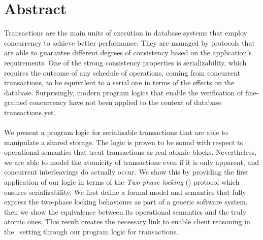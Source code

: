 \vspace*{\fill}
\section*{Abstract}

Transactions are the main units of execution in database systems that employ concurrency to achieve better performance. They are managed by protocols that are able to guarantee different degrees of consistency based on the application's requirements. One of the strong consistency properties is serializability, which requires the outcome of any schedule of operations, coming from concurrent transactions, to be equivalent to a serial one in terms of the effects on the database. Surprisingly, modern program logics that enable the verification of fine-grained concurrency have not been applied to the context of database transactions yet. \\ \\
We present a program logic for serializable transactions that are able to manipulate a shared storage. The logic is proven to be sound with respect to operational semantics that treat transactions as real atomic blocks. Nevertheless, we are able to model the atomicity of transactions even if it is only apparent, and concurrent interleavings do actually occur. We show this by providing the first application of our logic in terms of the \textit{Two-phase locking} (\tpl) protocol which ensures serializability.
We first define a formal model and semantics that fully express the two-phase locking behaviours as part of a generic software system, then we show the equivalence between its operational semantics and the truly atomic ones. This result creates the necessary link to enable client reasoning in the \tpl\ setting through our program logic for transactions.
\vspace*{\fill}